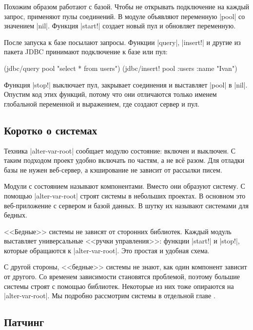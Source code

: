 Похожим образом работают с базой. Чтобы не открывать подключение на каждый
запрос, применяют пулы соединений. В модуле объявляют переменную \spverb|pool|
со значением \spverb|nil|. Функция \spverb|start!| создает новый пул и обновляет
переменную.

После запуска к базе посылают запросы. Функции \spverb|query|, \spverb|insert!|
и другие из пакета JDBC принимают подключение к базе или пул:

\begin{english}
  \begin{clojure}
(jdbc/query pool "select * from users")
(jdbc/insert! pool :users {:name "Ivan"})
  \end{clojure}
\end{english}

Функция \spverb|stop!| выключает пул, закрывает соединения и выставляет
\spverb|pool| в \spverb|nil|. Опустим код этих функций, потому что они
отличаются только именем глобальной переменной и выражением, где создают сервер
и пул.

\subsection{Коротко о системах}

\label{systems-intro}

Техника \spverb|alter-var-root| сообщает модулю состояние: включен и выключен. С
таким подходом проект удобно включать по частям, а не вс\"{е} разом. Для отладки
базы не нужен веб-сервер, а кэширование не зависит от рассылки писем.

Модули с состоянием называют компонентами. Вместо они образуют систему. С
помощью \spverb|alter-var-root| строят системы в небольших проектах. В основном
это веб-приложение с сервером и базой данных. В шутку их называют системами для
бедных.

<<Бедные>> системы не зависят от сторонних библиотек. Каждый модуль выставляет
универсальные <<ручки управления>>: функции \spverb|start!| и \spverb|stop!|,
которые обращаются к \spverb|alter-var-root|. Это простая и удобная схема.

С другой стороны, <<бедные>> системы не знают, как один компонент зависит от
другого. Со временем зависимости становятся проблемой, поэтому большие системы
строят с помощью библиотек. Некоторые из них тоже опираются на
\spverb|alter-var-root|. Мы подробно рассмотрим системы в отдельной
главе .

\subsection{Патчинг}

